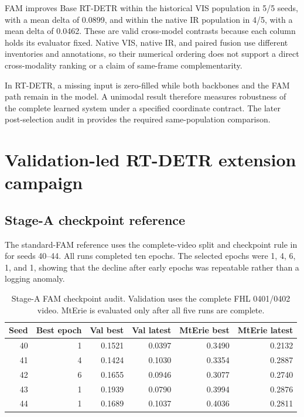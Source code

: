 FAM improves Base RT-DETR within the historical VIS population in 5/5
seeds, with a mean delta of 0.0899, and within the native IR population in 4/5,
with a mean delta of 0.0462. These are valid cross-model contrasts because each
column holds its evaluator fixed. Native VIS, native IR, and paired fusion use
different inventories and annotations, so their numerical ordering
does not support a direct cross-modality ranking or a claim of same-frame
complementarity.

In RT-DETR, a missing input is zero-filled while both backbones and the FAM path
remain in the model. A unimodal result therefore measures robustness of the
complete learned system under a specified coordinate contract. The later
post-selection audit in  provides the required
same-population comparison.

\section{Validation-led RT-DETR extension campaign}
\label{sec:validation-led-campaign}

\subsection{Stage-A checkpoint reference}

The standard-FAM reference uses the complete-video split and checkpoint rule in
 for seeds 40--44. All runs completed ten epochs.
The selected epochs were 1, 4, 6, 1, and 1, showing that the decline after
early epochs was repeatable rather than a logging anomaly.

\begin{table}[htbp]
  \centering
  \caption{Stage-A FAM checkpoint audit. Validation uses the complete FHL
  0401/0402 video. MtErie is evaluated only after all five runs are complete.}
  \label{tab:stage-a-checkpoint-audit}
  \begin{tabular}{rrrrrr}
    \toprule
    Seed & Best epoch & Val best & Val latest & MtErie best & MtErie latest \\
    \midrule
    40 & 1 & 0.1521 & 0.0397 & 0.3490 & 0.2132 \\
    41 & 4 & 0.1424 & 0.1030 & 0.3354 & 0.2887 \\
    42 & 6 & 0.1655 & 0.0946 & 0.3077 & 0.2740 \\
    43 & 1 & 0.1939 & 0.0790 & 0.3994 & 0.2876 \\
    44 & 1 & 0.1689 & 0.1037 & 0.4036 & 0.2811 \\
    \bottomrule
  \end{tabular}
\end{table}

